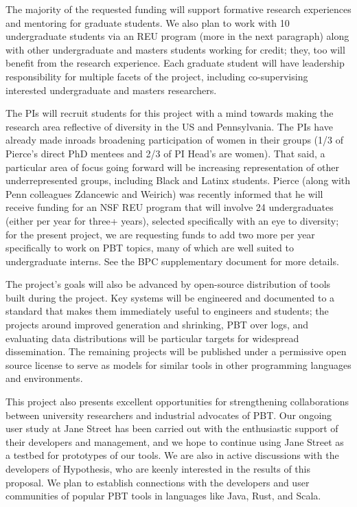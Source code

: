 \smallskip
{}
%
The majority of the requested funding will support formative research
experiences and mentoring for graduate students. We
also plan to work with 10 undergraduate students via an
REU program (more in the next paragraph) along with other
undergraduate and masters
students working for credit;
they, too will benefit from the research experience. Each graduate
student will have leadership responsibility for multiple facets of the
project, including co-supervising interested undergraduate and masters
researchers.

The PIs will recruit students for this project with a mind towards making
the research area reflective of diversity in the US and Pennsylvania.
The PIs have already made inroads broadening participation of women in their
groups (1/3 of Pierce's direct PhD mentees and 2/3 of PI
Head's are women). That said, a particular area of focus going forward
will be increasing representation of
other underrepresented groups, including Black and Latinx
students. Pierce (along with Penn colleagues Zdancewic and Weirich)
was recently informed that he will receive funding for an
NSF REU program that will involve 24 undergraduates (either per
year for three+ years), selected specifically with an eye to diversity;
for the present project, we are requesting funds to add two more per
year specifically to work on PBT topics, many of which are well suited
to undergraduate interns. See the BPC
supplementary
document for more details.

\smallskip
{}
%
The project's goals will also be advanced by open-source distribution of tools
built during the project. Key systems will be engineered and documented to a standard
that makes them immediately useful to engineers and students; the projects around
improved generation and shrinking, PBT over logs, and evaluating data
distributions will be particular targets for widespread
dissemination. The remaining projects will be published under a permissive
open source license to serve as models for similar tools in other
programming languages and environments.

This project also presents excellent opportunities for strengthening
collaborations between university researchers and industrial advocates of PBT.  Our
ongoing user study at Jane Street has been carried out with the
enthusiastic support of their developers and management, and we hope
to continue using Jane Street as a testbed for prototypes of our
tools.  We are also in active discussions with the
developers of Hypothesis, who are keenly
interested in the results of this proposal.
We plan to establish connections with the
developers and user communities of popular PBT tools in languages like
Java, Rust, and Scala.

